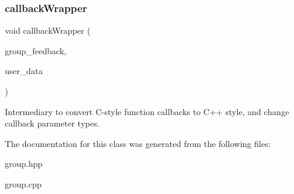 \subsubsection{\texorpdfstring{callback\+Wrapper}{callbackWrapper}}
{\footnotesize\ttfamily void callback\+Wrapper (\begin{DoxyParamCaption}\item[{Hebi\+Group\+Feedback\+Ptr}]{group\+\_\+feedback,  }\item[{void $\ast$}]{user\+\_\+data }\end{DoxyParamCaption})\hspace{0.3cm}{\ttfamily [friend]}}

Intermediary to convert C-\/style function callbacks to C++ style, and change callback parameter types. 

The documentation for this class was generated from the following files\+:\begin{DoxyCompactItemize}
\item 
group.\+hpp\item 
group.\+cpp\end{DoxyCompactItemize}
